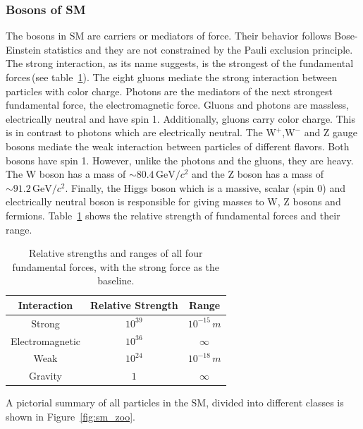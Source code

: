 \subsubsection{Bosons of SM}
The bosons in SM are carriers or mediators of force. Their behavior follows Bose-Einstein statistics and they are not constrained by the Pauli exclusion principle. The strong interaction, as its name suggests, is the strongest of the fundamental forces\,(see table~\ref{tab:forces}). The eight gluons mediate the strong interaction between particles with color charge. Photons are the mediators of the next strongest fundamental force, the electromagnetic force. Gluons and photons are massless, electrically neutral and have spin 1. Additionally, gluons carry color charge. This is in contrast to photons which are electrically neutral. The $\mathrm{W}^+$,$\mathrm{W}^-$ and Z gauge bosons mediate the weak interaction between particles of different flavors. Both bosons have spin 1. However, unlike the photons and the gluons, they are heavy. The W boson has a mass of $\sim 80.4\,\mathrm{GeV}/c^2$ and the Z boson has a mass of $\sim 91.2\,\mathrm{GeV}/c^2$. Finally, the Higgs boson which is a massive, scalar (spin 0) and electrically neutral boson is responsible for giving masses to W, Z bosons and fermions. Table~\ref{tab:forces} shows the relative strength of fundamental forces and their range.         

\begin{table}[hbtp]
\begin{center}
\caption{Relative strengths and ranges of all four fundamental forces, with the strong force as the baseline.}
\begin{tabular}{c|c|c}
\hline
Interaction & Relative Strength & Range \\
\hline
Strong & $10^{39}$ & $10^{-15}\,m$\\
Electromagnetic & $10^{36}$& $\infty$\\
Weak &  $10^{24}$ &$10^{-18}\,m$\\
Gravity & $1$ &$\infty$\\
\hline
\end{tabular}
\label{tab:forces}
\end{center}
\end{table}

A pictorial summary of all particles in the SM, divided into different classes is shown in Figure~\ref{fig:sm_zoo}.

